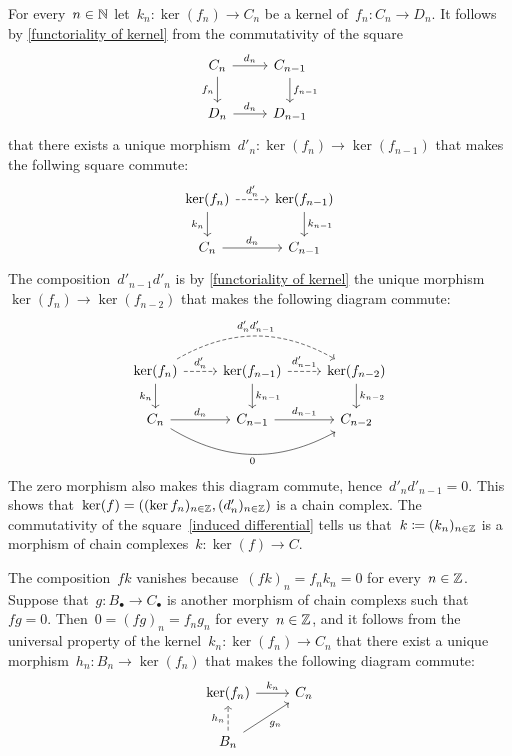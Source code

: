 For every~$n \in \mathbb{N}$ let~$k_n \colon \ker(f_n) \to C_n$ be a kernel of~$f_n \colon C_n \to D_n$.
It follows by \cref{functoriality of kernel} from the commutativity of the square
\[
  \begin{tikzcd}
      C_n
      \arrow{r}[above]{d_n}
      \arrow{d}[left]{f_n}
    & C_{n-1}
      \arrow{d}[right]{f_{n-1}}
    \\
      D_n
      \arrow{r}[above]{d_n}
    & D_{n-1}
  \end{tikzcd}
\]
that there exists a unique morphism~$d'_n \colon \ker(f_n) \to \ker(f_{n-1})$ that makes the follwing square commute:
\begin{equation}
  \label{induced differential}
  \begin{tikzcd}
      \ker(f_n)
      \arrow[dashed]{r}[above]{d'_n}
      \arrow{d}[left]{k_n}
    & \ker(f_{n-1})
      \arrow{d}[right]{k_{n-1}}
    \\
      C_n
      \arrow{r}[above]{d_n}
    & C_{n-1}
  \end{tikzcd}
\end{equation}
The composition~$d'_{n-1} d'_n$ is by \cref{functoriality of kernel} the unique morphism~$\ker(f_n) \to \ker(f_{n-2})$ that makes the following diagram commute:
\[
  \begin{tikzcd}
      \ker(f_n)
      \arrow[dashed, bend left]{rr}[above]{d'_n d'_{n-1}}
      \arrow[dashed]{r}[above]{d'_n}
      \arrow{d}[left]{k_n}
    & \ker(f_{n-1})
      \arrow[dashed]{r}[above]{d'_{n-1}}
      \arrow{d}[right]{k_{n-1}}
    & \ker(f_{n-2})
      \arrow{d}[right]{k_{n-2}}
    \\
      C_n
      \arrow{r}[above]{d_n}
      \arrow[bend right]{rr}[below]{0}
    & C_{n-1}
      \arrow{r}[above]{d_{n-1}}
    & C_{n-2}
  \end{tikzcd}
\]
The zero morphism also makes this diagram commute, hence~$d'_n d'_{n-1} = 0$.
This shows that~$\ker(f) = ((\ker f_n)_{n \in \mathbb{Z}}, (d'_n)_{n \in \mathbb{Z}})$ is a chain complex.
The commutativity of the square~\eqref{induced differential} tells us that~$k \coloneqq (k_n)_{n \in \mathbb{Z}}$ is a morphism of chain complexes~$k \colon \ker(f) \to C$.

The composition~$f k$ vanishes because~$(fk)_n = f_n k_n = 0$ for every~$n \in \mathbb{Z}$.
Suppose that~$g \colon B_\bullet \to C_\bullet$ is another morphism of chain complexs such that~$f g = 0$.
Then~$0 = (fg)_n = f_n g_n$ for every~$n \in \mathbb{Z}$, and it follows from the universal property of the kernel~$k_n \colon \ker(f_n) \to C_n$ that there exist a unique morphism~$h_n \colon B_n \to \ker(f_n)$ that makes the following diagram commute:
\begin{equation}
  \label{constructing triangle}
  \begin{tikzcd}
      \ker(f_n)
      \arrow{r}[above]{k_n}
    & C_n
    \\
      B_n
      \arrow[dashed]{u}[left]{h_n}
      \arrow{ur}[below right]{g_n}
    & {}
  \end{tikzcd}
\end{equation}

